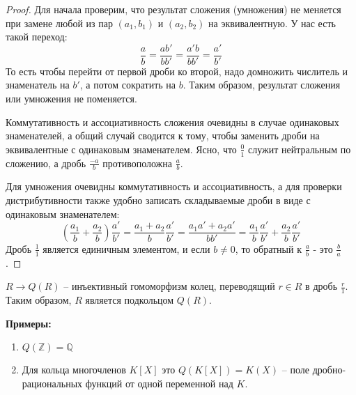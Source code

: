 \begin{proof}
    Для начала проверим, что результат сложения (умножения) не меняется при замене любой из пар $(a_1, b_1)$ и $(a_2, b_2)$ на эквивалентную.
    У нас есть такой переход:
    \[ \frac{a}{b} = \frac{ab'}{bb'} = \frac{a'b}{bb'} = \frac{a'}{b'} \]
    То есть чтобы перейти от первой дроби ко второй, надо домножить числитель и знаменатель на $b'$, а потом сократить на $b$. Таким образом, результат сложения или умножения не поменяется.
    
    Коммутативность и ассоциативность сложения очевидны в случае одинаковых знаменателей, а общий случай сводится к тому, чтобы заменить дроби на эквивалентные с одинаковым знаменателем.
    Ясно, что $\frac{0}{1}$ служит нейтральным по сложению, а дробь $\frac{-a}{b}$ противоположна $\frac{a}{b}$.
    
    Для умножения очевидны коммутативность и ассоциативность, 
    а для проверки дистрибутивности также удобно записать складываемые дроби в виде с одинаковым знаменателем:
    \[ (\frac{a_1}{b} + \frac{a_2}{b})\frac{a'}{b'} = \frac{a_1 + a_2}{b}\frac{a'}{b'} 
    = \frac{a_1a' + a_2a'}{bb'} = \frac{a_1}{b}\frac{a'}{b'} + \frac{a_2}{b}\frac{a'}{b'} \]
    Дробь $\frac{1}{1}$ является единичным элементом, и если $b \neq 0$, то обратный к $\frac{a}{b}$ - это $\frac{b}{a}$.
\end{proof}

\begin{notice}
    $R \to Q(R)$ -- инъективный гомоморфизм колец, переводящий $r \in R$ в дробь $\frac{r}{1}$. Таким образом, $R$ является подкольцом $Q(R)$.
\end{notice}

\textbf{Примеры:}
\begin{enumerate}
    \item $Q(\mathbb{Z}) = \mathbb{Q}$
    \item Для кольца многочленов $K[X]$ это $Q(K[X]) = K(X)$ -- поле дробно-рациональных функций от одной переменной над $K$.
\end{enumerate}